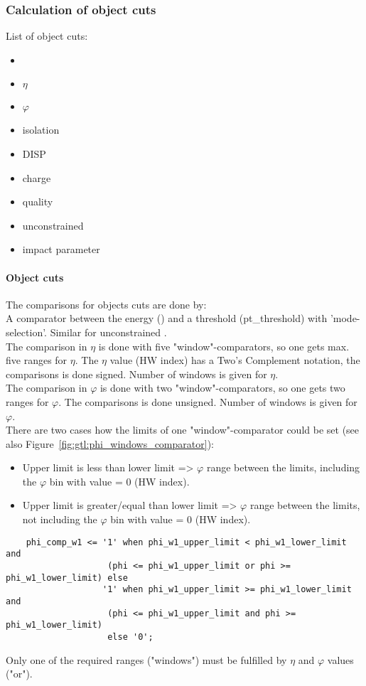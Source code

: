 \clearpage

\subsubsection{Calculation of object cuts}
\label{sec:gtl:calc_obj_cuts}

List of object cuts:
\begin{itemize}
\item \pt
\item $\eta$
\item $\varphi$
\item isolation
\item DISP
\item charge
\item quality
\item unconstrained \pt
\item impact parameter
\end{itemize}

\paragraph{Object cuts}
\label{sec:gtl:object_cuts}
The comparisons for objects cuts are done by:\\
A comparator between the energy (\pt) and a threshold (pt\_threshold) with 'mode-selection'. Similar for unconstrained \pt.\\
The comparison in $\eta$ is done with five "window"-comparators, so one gets max. five ranges for $\eta$. The $\eta$ value (HW index) has a Two's Complement notation, the comparisons is done signed. Number of windows is given for $\eta$.\\
The comparison in $\varphi$ is done with two "window"-comparators, so one gets two ranges for $\varphi$. The comparisons is done unsigned. Number of windows is given for $\varphi$.\\
There are two cases how the limits of one "window"-comparator could be set (see also Figure~\ref{fig:gtl:phi_windows_comparator}):
\begin{itemize}
\item Upper limit is less than lower limit => $\varphi$ range between the limits, including the $\varphi$ bin with value = 0 (HW index).
\item Upper limit is greater/equal than lower limit => $\varphi$ range between the limits, not including the $\varphi$ bin with value = 0 (HW index).
\end{itemize}
\begin{lstlisting}
    phi_comp_w1 <= '1' when phi_w1_upper_limit < phi_w1_lower_limit and
                    (phi <= phi_w1_upper_limit or phi >= phi_w1_lower_limit) else
                   '1' when phi_w1_upper_limit >= phi_w1_lower_limit and
                    (phi <= phi_w1_upper_limit and phi >= phi_w1_lower_limit)
                    else '0';
\end{lstlisting}
Only one of the required ranges ("windows") must be fulfilled by $\eta$ and $\varphi$ values ("or").\\

